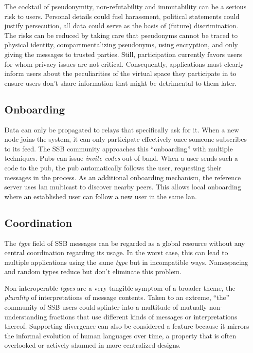 \documentclass[9pt,sigconf,rewiew]{acmart}
\begin{document}
The cocktail of pseudonymity, non-refutability and immutability can be a serious risk to users. Personal details could fuel harassment, political statements could justify persecution, all data could serve as the basis of (future) discrimination. The risks can be reduced by taking care that pseudonyms cannot be traced to physical identity, compartmentalizing pseudonyms, using encryption, and only giving the messages to trusted parties. Still, participation currently favors users for whom privacy issues are not critical. Consequently, applications must clearly inform users about the peculiarities of the virtual space they participate in to ensure users don't share information that might be detrimental to them later.

\subsection{Onboarding}

Data can only be propagated to relays that specifically ask for it. When a new node joins the system, it can only participate effectively once someone subscribes to its feed. The SSB community approaches this ``onboarding'' with multiple techniques. Pubs can issue \textit{invite codes} out-of-band. When a user sends such a code to the pub, the pub automatically follows the user, requesting their messages in the process. As an additional onboarding mechanism, the reference server uses lan multicast to discover nearby peers. This allows local onboarding where an established user can follow a new user in the same lan.

\subsection{Coordination}

The \textit{type} field of SSB messages can be regarded as a global resource without any central coordination regarding its usage. In the worst case, this can lead to multiple applications using the same \textit{type} but in incompatible ways. Namespacing and random types reduce but don't eliminate this problem.

Non-interoperable \textit{types} are a very tangible symptom of a broader theme, the \textit{plurality} of interpretations of message contents. Taken to an extreme, ``the'' community of SSB users could splinter into a multitude of mutually non-understanding fractions that use different kinds of messages or interpretations thereof. Supporting divergence can also be considered a feature because it mirrors the informal evolution of human languages over time, a property that is often overlooked or actively shunned in more centralized designs.
\end{document}
